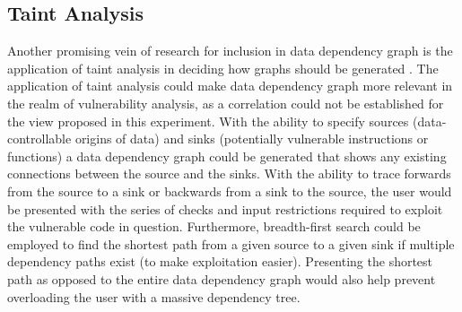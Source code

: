 \subsection{Taint Analysis}
Another promising vein of research for inclusion in data dependency graph is the application of taint analysis in deciding how graphs should be generated \citep{clause2007dytan}. The application of taint analysis could make data dependency graph more relevant in the realm of vulnerability analysis, as a correlation could not be established for the view proposed in this experiment. With the ability to specify sources (data-controllable origins of data) and sinks (potentially vulnerable instructions or functions) a data dependency graph could be generated that shows any existing connections between the source and the sinks. With the ability to trace forwards from the source to a sink or backwards from a sink to the source, the user would be presented with the series of checks and input restrictions required to exploit the vulnerable code in question. Furthermore, breadth-first search could be employed to find the shortest path from a given source to a given sink if multiple dependency paths exist (to make exploitation easier). Presenting the shortest path as opposed to the entire data dependency graph would also help prevent overloading the user with a massive dependency tree.